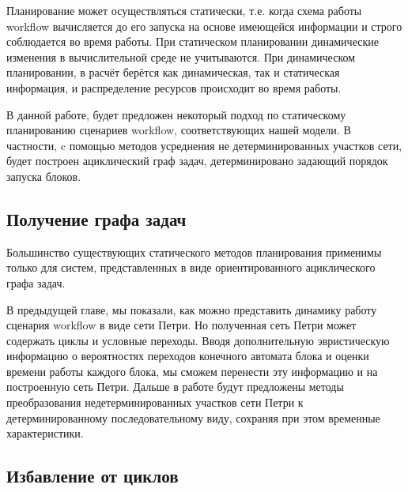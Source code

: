 \documentclass[a4paper,12pt]{article}
\begin{document}
Планирование может осуществляться статически, т.е. когда схема работы workflow вычисляется до его запуска на основе имеющейся информации и строго соблюдается во время работы. При статическом планировании динамические изменения в вычислительной среде не учитываются. При динамическом планировании, в расчёт берётся как динамическая, так и статическая информация, и распределение ресурсов происходит во время работы.

В данной работе, будет предложен некоторый подход по статическому планированию сценариев workflow, соответствующих нашей модели. В частности, c помощью методов усреднения не детерминированных участков сети, будет построен ациклический граф задач, детерминировано задающий порядок запуска блоков. 

\subsection{Получение графа задач}
Большинство существующих статического методов планирования применимы только для систем, представленных в виде ориентированного ациклического графа задач.

В предыдущей главе, мы показали, как можно представить динамику работу сценария workflow  в виде сети Петри. Но полученная сеть Петри может содержать циклы  и условные переходы. Вводя дополнительную эвристическую информацию о вероятностях переходов конечного автомата блока и оценки времени работы каждого блока, мы сможем перенести эту информацию и на построенную сеть Петри. Дальше в работе будут предложены методы преобразования недетерминированных участков сети Петри к детерминированному последовательному виду, сохраняя при этом временные характеристики.
\subsection*{Избавление от циклов}
\end{document}
